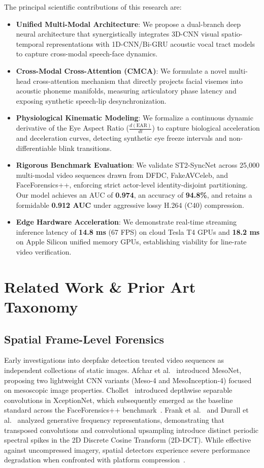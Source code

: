 \documentclass[journal]{IEEEtran}
\begin{document}
The principal scientific contributions of this research are:
\begin{itemize}
    \item \textbf{Unified Multi-Modal Architecture}: We propose a dual-branch deep neural architecture that synergistically integrates 3D-CNN visual spatio-temporal representations with 1D-CNN/Bi-GRU acoustic vocal tract models to capture cross-modal speech-face dynamics.
    \item \textbf{Cross-Modal Cross-Attention (CMCA)}: We formulate a novel multi-head cross-attention mechanism that directly projects facial visemes into acoustic phoneme manifolds, measuring articulatory phase latency and exposing synthetic speech-lip desynchronization.
    \item \textbf{Physiological Kinematic Modeling}: We formalize a continuous dynamic derivative of the Eye Aspect Ratio ($\frac{d(\text{EAR})}{dt}$) to capture biological acceleration and deceleration curves, detecting synthetic eye freeze intervals and non-differentiable blink transitions.
    \item \textbf{Rigorous Benchmark Evaluation}: We validate ST2-SyncNet across 25,000 multi-modal video sequences drawn from DFDC, FakeAVCeleb, and FaceForensics++, enforcing strict actor-level identity-disjoint partitioning. Our model achieves an AUC of \textbf{0.974}, an accuracy of \textbf{94.8\%}, and retains a formidable \textbf{0.912 AUC} under aggressive lossy H.264 (C40) compression.
    \item \textbf{Edge Hardware Acceleration}: We demonstrate real-time streaming inference latency of \textbf{14.8 ms} (67 FPS) on cloud Tesla T4 GPUs and \textbf{18.2 ms} on Apple Silicon unified memory GPUs, establishing viability for line-rate video verification.
\end{itemize}

\section{Related Work \& Prior Art Taxonomy}

\subsection{Spatial Frame-Level Forensics}
Early investigations into deepfake detection treated video sequences as independent collections of static images. Afchar et al.~\cite{afchar2018mesonet} introduced MesoNet, proposing two lightweight CNN variants (Meso-4 and MesoInception-4) focused on mesoscopic image properties. Chollet~\cite{chollet2017xception} introduced depthwise separable convolutions in XceptionNet, which subsequently emerged as the baseline standard across the FaceForensics++ benchmark~\cite{rossler2019faceforensics}. Frank et al.~\cite{frank2020leveraging} and Durall et al.~\cite{durall2020watch} analyzed generative frequency representations, demonstrating that transposed convolutions and convolutional upsampling introduce distinct periodic spectral spikes in the 2D Discrete Cosine Transform (2D-DCT). While effective against uncompressed imagery, spatial detectors experience severe performance degradation when confronted with platform compression~\cite{verdoliva2020media}.
\end{document}
